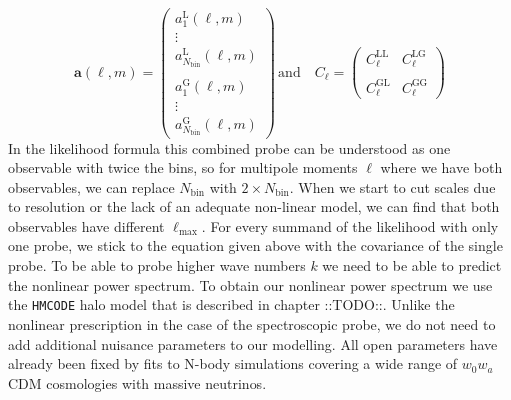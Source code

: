 \documentclass[oneside]{book}
\newcommand*{\marktodo}{{\color{mmcol} ::TODO::}\xspace}
\begin{document}
 \begin{equation}
    \boldsymbol{a}(\ell,m) =  \left(\begin{array}{c}
        a^\mathrm{L}_1 (\ell,m) \\
        \vdots \\
        a^\mathrm{L}_{N_\mathrm{bin}}(\ell,m)\\\\
        a^\mathrm{G}_1(\ell,m) \\
        \vdots \\
        a^\mathrm{G}_{N_\mathrm{bin}}(\ell,m)
    \end{array}\right)\,\text{and}\quad C_\ell = \left(\begin{array}{cc}
        C^\mathrm{LL}_\ell &  C^\mathrm{LG}_\ell\\\\
        C^\mathrm{GL}_\ell & C^\mathrm{GG}_\ell
    \end{array} \right)
 \end{equation}
 In the likelihood formula this combined probe can be understood as one observable with twice the bins, so for multipole moments $\ell$ where we have both observables, we can replace $N_\mathrm{bin}$ with $2\times N_\mathrm{bin}$. When we start to cut scales due to resolution or the lack of an adequate non-linear model, we can find that both observables have different $\ell_\mathrm{max}$. For every summand of the likelihood with only one probe, we stick to the equation given above with the covariance of the single probe. 
 To be able to probe higher wave numbers $k$ we need to be able to predict the nonlinear power spectrum. To obtain our nonlinear power spectrum we use the {\tt HMCODE} halo model that is described in chapter \marktodo. Unlike the nonlinear prescription in the case of the spectroscopic probe, we do not need to add additional nuisance parameters to our modelling. All open parameters have already been fixed by fits to N-body simulations covering a wide range of $w_0w_a$CDM cosmologies with massive neutrinos.
\end{document}
